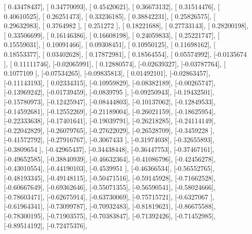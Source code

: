 \documentclass{article}
\begin{document}
       [ 0.43478437],
       [ 0.34770093],
       [ 0.45420621],
       [ 0.36673132],
       [ 0.31514476],
       [ 0.40610525],
       [ 0.26251473],
       [ 0.33236185],
       [ 0.38842231],
       [ 0.25826575],
       [ 0.29632983],
       [ 0.3764982 ],
       [ 0.251272  ],
       [ 0.18221688],
       [ 0.27733143],
       [ 0.28200198],
       [ 0.33506699],
       [ 0.16146386],
       [ 0.16608198],
       [ 0.24059833],
       [ 0.25221747],
       [ 0.15559031],
       [ 0.10091466],
       [ 0.09308451],
       [ 0.10950125],
       [ 0.11698162],
       [ 0.18553377],
       [ 0.03402628],
       [ 0.17872981],
       [ 0.18564554],
       [ 0.05574992],
       [-0.0135674 ],
       [ 0.11111746],
       [-0.02065991],
       [ 0.12880574],
       [-0.02639327],
       [-0.03787764],
       [ 0.1077109 ],
       [-0.07534265],
       [-0.09835813],
       [ 0.01492101],
       [-0.02863457],
       [-0.11143193],
       [ 0.02334315],
       [-0.10959829],
       [-0.08382189],
       [-0.00265747],
       [-0.13969242],
       [-0.01739459],
       [-0.0839795 ],
       [-0.09250943],
       [-0.19432501],
       [-0.15780973],
       [-0.12425947],
       [-0.08444803],
       [-0.10137062],
       [-0.12849533],
       [-0.14592681],
       [-0.12552269],
       [-0.21189004],
       [-0.26021159],
       [-0.18625954],
       [-0.22333638],
       [-0.17401641],
       [-0.19039791],
       [-0.26218285],
       [-0.24114149],
       [-0.22042829],
       [-0.26079765],
       [-0.27622029],
       [-0.26528709],
       [-0.3459228 ],
       [-0.41572792],
       [-0.27916767],
       [-0.3067433 ],
       [-0.31974038],
       [-0.32655893],
       [-0.3809654 ],
       [-0.42965437],
       [-0.34438448],
       [-0.36447753],
       [-0.37467161],
       [-0.49652585],
       [-0.38840939],
       [-0.46632364],
       [-0.41086796],
       [-0.42456278],
       [-0.43010554],
       [-0.44190103],
       [-0.4539951 ],
       [-0.46366534],
       [-0.56552765],
       [-0.48193345],
       [-0.49148115],
       [-0.50471516],
       [-0.59145928],
       [-0.71662528],
       [-0.60667649],
       [-0.69362646],
       [-0.55071355],
       [-0.56590541],
       [-0.58024666],
       [-0.78603471],
       [-0.62675914],
       [-0.63730069],
       [-0.75715721],
       [-0.6327067 ],
       [-0.61964341],
       [-0.73099787],
       [-0.70932483],
       [-0.81819621],
       [-0.86675588],
       [-0.78300195],
       [-0.71903575],
       [-0.70383847],
       [-0.71392426],
       [-0.71452985],
       [-0.89514192],
       [-0.72475376],
\end{document}
